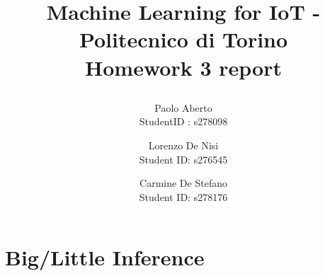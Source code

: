 \documentclass{article}
\date{}
\begin{document}
\author{Paolo Aberto\\
StudentID : s278098\\

\and
Lorenzo De Nisi\\
Student ID: s276545\\

\and
Carmine De Stefano\\
Student ID: s278176\\
}

\justifying

\title{
    \vspace{0.8cm}
    
    Machine Learning for IoT - 
    Politecnico di Torino\\
    \vspace{.5cm}
    \Large \textbf{Homework 3 report}
    \vspace{.1cm}
}

\maketitle
\thispagestyle{empty} 
\vspace{-0.9cm}


\section{Big/Little Inference}





\end{document}
